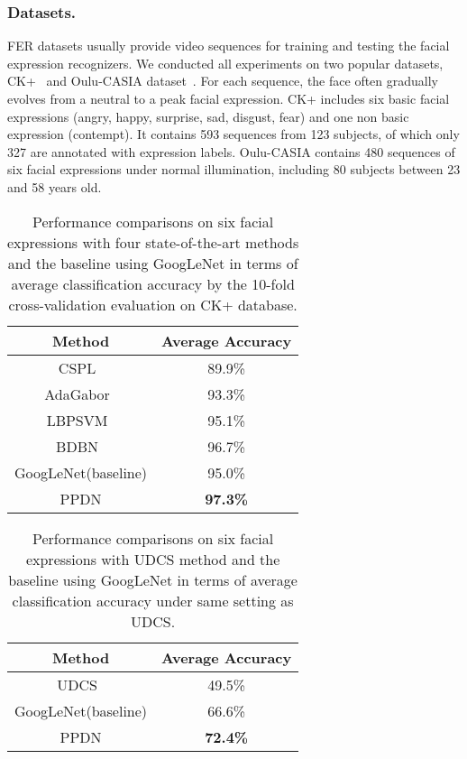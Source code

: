 \documentclass[runningheads]{llncs}
\begin{document}
\subsubsection{Datasets.} FER datasets usually provide video sequences for 
training and testing the facial expression recognizers. We conducted all 
experiments on two popular datasets, CK+~\cite{lucey2010extended} and  
Oulu-CASIA dataset~\cite{zhao2011facial}. For each sequence, the face 
often gradually evolves from a neutral to a peak facial expression. 
CK+ includes six basic facial expressions (angry, happy, surprise, sad, 
disgust, fear) and one non basic expression (contempt).  It contains 
593 sequences from 123 subjects, of which only 327 are annotated with 
expression labels. Oulu-CASIA contains 480 sequences of six facial 
expressions under normal illumination, including 80 subjects between 23 
and 58 years old. 

\begin{table}[!tp]
	\begin{center}
		\caption{Performance comparisons on six facial expressions with four state-of-the-art methods and the baseline using GoogLeNet in terms of average classification accuracy by the 10-fold cross-validation evaluation on CK+ database.}
		\label{table:ckcom_image}
		\begin{tabular}{c|c}
			\hline\noalign{\smallskip}
			Method & Average Accuracy\\
			
			\hline
			
			CSPL~\cite{zhong2012learning}  & 89.9\% \\
			AdaGabor~\cite{bartlett2005recognizing}&  93.3\% \\
			LBPSVM~\cite{shan2009facial} &  95.1\%\\
			BDBN~\cite{liu2014facial}& 96.7\% \\
			GoogLeNet(baseline) & 95.0\% \\
			\hline
			PPDN& \textbf{97.3\%} \\
			\hline
		\end{tabular}
	\end{center}
\end{table}


\begin{table}[!tp]
	\begin{center}
		\caption{Performance comparisons on six facial expressions with UDCS method and the baseline using GoogLeNet in terms of average classification accuracy under same setting as UDCS.}
		\label{table:oulucom_image}
	
		\begin{tabular}{c|c}
		   
			\hline\noalign{\smallskip}
			Method & Average Accuracy\\			
			\hline			
            UDCS~\cite{UDCS} & 49.5\% \\
			GoogLeNet(baseline) & 66.6\% \\
			\hline
			PPDN& \textbf{72.4\%} \\
			\hline
		\end{tabular}
	\end{center}
\end{table}
\end{document}
